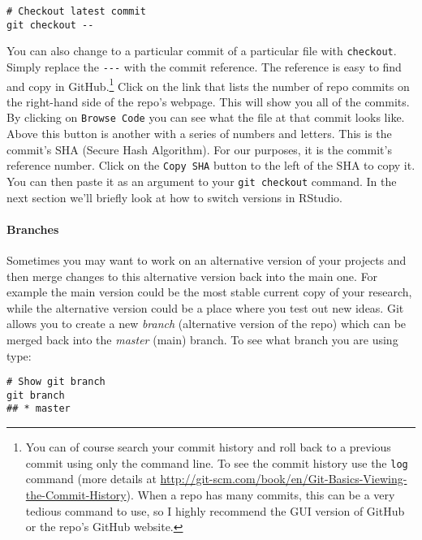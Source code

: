 \begin{knitrout}
\color{fgcolor}\begin{kframe}
\begin{verbatim}
# Checkout latest commit
git checkout --
\end{verbatim}
\end{kframe}
\end{knitrout}


\noindent You can also change to a particular commit of a particular file with \texttt{checkout}. Simply replace the \verb|---| with the commit reference. The reference is easy to find and copy in GitHub.\footnote{You can of course search your commit history and roll back to a previous commit using only the command line. To see the commit history use the \texttt{log} command (more details at \url{http://git-scm.com/book/en/Git-Basics-Viewing-the-Commit-History}). When a repo has many commits, this can be a very tedious command to use, so I highly recommend the GUI version of GitHub or the repo's GitHub website.} Click on the link that lists the number of repo commits on the right-hand side of the repo's webpage. This will show you all of the commits. By clicking on {\tt{Browse Code}} you can see what the file at that commit looks like. Above this button is another with a series of numbers and letters. This is the commit's SHA (Secure Hash Algorithm). For our purposes, it is the commit's reference number. Click on the {\tt{Copy SHA}} button to the left of the SHA to copy it. You can then paste it as an argument to your {\tt{git checkout}} command. In the next section we'll briefly look at how to switch versions in RStudio.

\paragraph{Branches}

Sometimes you may want to work on an alternative version of your projects and then merge changes to this alternative version back into the main one. For example the main version could be the most stable current copy of your research, while the alternative version could be a place where you test out new ideas. Git allows you to create a new \emph{branch} (alternative version of the repo) which can be merged back into the \emph{master} (main) branch. To see what branch you are using type:

\begin{knitrout}
\color{fgcolor}\begin{kframe}
\begin{verbatim}
# Show git branch
git branch
## * master
\end{verbatim}
\end{kframe}
\end{knitrout}


